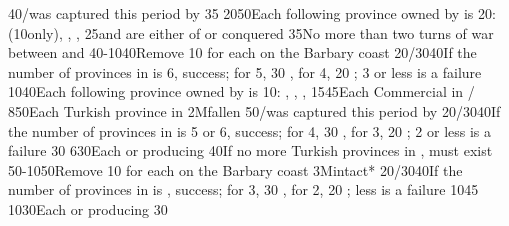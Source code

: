{}{40}{\provinceOsterreich/\villeVienne was captured this period by \TUR}%
%
%
{}{35}{}%
%
%
{20}{50}{Each following province owned by \TUR is 20\VPs: \provinceCyclades
  (10\VPs only), \provinceKreta, \provinceMalta, \provinceChypre}%
%
%
{}{25}{\paysvalachie and \paysmoldavie are either \VASSAL of \TUR or
  conquered}%
%
%
%
{}{35}{No more than two turns of war between \AUSaus and \TUR}%
%
%
{40-10}{40}{Remove 10 \VPs for each \Presidio on the Barbary coast}%
%
%
{20/30}{40}{If the number of provinces in \payscrimee is 6, success; for 5, 30
  \VPs, for 4, 20 \VPs; 3 or less is a failure}%
%
%
{10}{40}{Each following province owned by \TUR is 10\VPs: \provinceCorfou,
  \provinceKreta, \provinceMalta, \provinceChypre}%
%
%
{15}{45}{Each Commercial  in \CTZ/\STZ}
%
%
%
{8}{50}{Each Turkish province in \payshongrie}%
%
\EUobjective2M{\villeVienne fallen}{}%
{}{50}{\provinceOsterreich/\villeVienne was captured this period by \TUR}%
%
%
{20/30}{40}{If the number of provinces in \payscrimee is 5 or 6, success; for
  4, 30 \VPs, for 3, 20 \VPs; 2 or less is a failure}%
%
%
{}{30}{}%
%
%
{6}{30}{Each \COL or \TP producing \POSPICE}%
%
%
%
%
{}{40}{If no more Turkish provinces in \payshongrie, \paystransylvanie must
  exist}%
%
%
%
{50-10}{50}{Remove 10 \VPs for each \Presidio on the Barbary coast}%
%
\EUobjective3M{\payscrimee intact*}{}%
{20/30}{40}{If the number of provinces in \payscrimee is , success; for
  3, 30 \VPs, for 2, 20 \VPs; less is a failure}%
%
%
{10}{45}{}%
%
%
{10}{30}{Each \COL or \TP producing \POSPICE}%
%
%
%
{}{30}{}%
%
%
